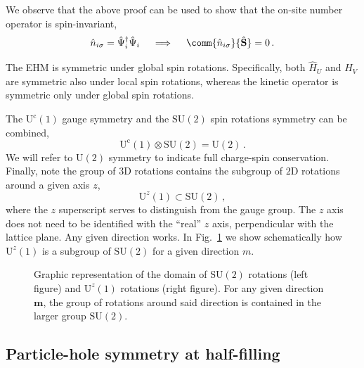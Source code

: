 %
We observe that the above proof can be used to show that the on-site number operator is spin-invariant,
\begin{equation}\label{eq:ehm-n-spin}
	\hat n_{i\sigma} = \hat \Psi_i^\dagger \hat \Psi_i 
	\quad\implies\quad
	\comm{\hat n_{i\sigma}}{\hat{\mathbf{S}}} = 0 \, .
\end{equation}

The EHM is symmetric under global spin rotations. Specifically, both $\hat H_U$ and $\hat H_V$ are symmetric also under local spin rotations, whereas the kinetic operator is symmetric only under global spin rotations.

The $\mathrm{U}^\mathrm{c}(1)$ gauge symmetry and the $\mathrm{SU}(2)$ spin rotations symmetry can be combined,
\[
	\mathrm{U}^\mathrm{c}(1) \otimes \mathrm{SU}(2) = \mathrm{U}(2) \, .
\]
We will refer to $\mathrm{U}(2)$ symmetry to indicate full charge-spin conservation. Finally, note the group of $3$D rotations contains the subgroup of $2$D rotations around a given axis $z$,
\[
	\mathrm{U}^z(1) \subset \mathrm{SU}(2) \, ,
\]
where the $z$ superscript serves to distinguish from the gauge group. The $z$ axis does not need to be identified with the ``real'' $z$ axis, perpendicular with the lattice plane. Any given direction works. In Fig.~\ref{fig:su2-u1-domains} we show schematically how $\mathrm{U}^z(1)$ is a subgroup of $\mathrm{SU}(2)$ for a given direction $m$.

\begin{figure}
	\centering
	\hspace{2em}
	\caption{Graphic representation of the domain of $\mathrm{SU}(2)$ rotations (left figure) and $\mathrm{U}^z(1)$ rotations (right figure). For any given direction $\mathbf{m}$, the group of rotations around said direction is contained in the larger group $\mathrm{SU}(2)$.}
	\label{fig:su2-u1-domains}
\end{figure}

\subsection{Particle-hole symmetry at half-filling}\label{subsec:phs}

